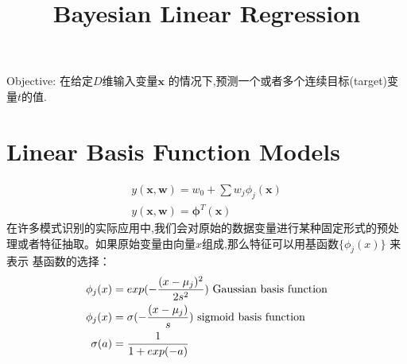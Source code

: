 \documentclass[a4paper]{article}
\begin{document}
\title{Bayesian Linear Regression}
\author{}
\maketitle

Objective:
在给定$D$维输入变量$\mathbf{x}$ 的情况下,预测一个或者多个连续目标(target)变量$t$的值.

\section{Linear Basis Function Models}
\begin{align*}
  y(\mathbf{x},\mathbf{w}) = w_0 + \sum w_j\phi_j(\mathbf{x})\\
  y(\mathbf{x},\mathbf{w}) = \boldsymbol{\phi}^T(\mathbf{x})
\end{align*}
在许多模式识别的实际应用中,我们会对原始的数据变量进行某种固定形式的预处理或者特征抽取。如果原始变量由向量$x$组成,那么特征可以用基函数$\{\phi_j(x)\}$ 来表示
基函数的选择：
\begin{align*}
  \phi_j(x) &= exp(-{(x-\mu_j)^2 \over 2s^2 }) \text{ Gaussian basis function}\\
  \phi_j(x) &= \sigma(-{(x-\mu_j) \over s }) \text{  sigmoid basis function}\\
  \sigma(a) &= {1 \over 1+exp(-a)}
\end{align*}
\end{document}
